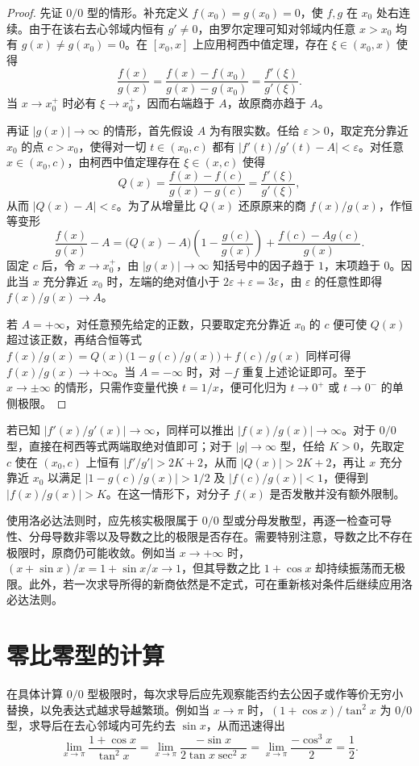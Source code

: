 \documentclass[UTF8,fontset=fandol,a4paper,12pt]{ctexart}
\theoremstyle{definition}
\begin{document}
\begin{proof}
先证 $0/0$ 型的情形。补充定义 $f(x_0)=g(x_0)=0$，使 $f,g$ 在 $x_0$ 处右连续。由于在该右去心邻域内恒有 $g'\ne0$，由罗尔定理可知对邻域内任意 $x>x_0$ 均有 $g(x)\ne g(x_0)=0$。在 $[x_0,x]$ 上应用柯西中值定理，存在 $\xi\in(x_0,x)$ 使得
\[
 \frac{f(x)}{g(x)}=\frac{f(x)-f(x_0)}{g(x)-g(x_0)}=\frac{f'(\xi)}{g'(\xi)}.
\]
当 $x\to x_0^+$ 时必有 $\xi\to x_0^+$，因而右端趋于 $A$，故原商亦趋于 $A$。

再证 $|g(x)|\to\infty$ 的情形，首先假设 $A$ 为有限实数。任给 $\varepsilon>0$，取定充分靠近 $x_0$ 的点 $c>x_0$，使得对一切 $t\in(x_0,c)$ 都有 $|f'(t)/g'(t)-A|<\varepsilon$。对任意 $x\in(x_0,c)$，由柯西中值定理存在 $\xi\in(x,c)$ 使得
\[
 Q(x)=\frac{f(x)-f(c)}{g(x)-g(c)}=\frac{f'(\xi)}{g'(\xi)},
\]
从而 $|Q(x)-A|<\varepsilon$。为了从增量比 $Q(x)$ 还原原来的商 $f(x)/g(x)$，作恒等变形
\[
 \frac{f(x)}{g(x)}-A
  =\bigl(Q(x)-A\bigr)\left(1-\frac{g(c)}{g(x)}\right)
   +\frac{f(c)-Ag(c)}{g(x)}.
\]
固定 $c$ 后，令 $x\to x_0^+$，由 $|g(x)|\to\infty$ 知括号中的因子趋于 $1$，末项趋于 $0$。因此当 $x$ 充分靠近 $x_0$ 时，左端的绝对值小于 $2\varepsilon+\varepsilon=3\varepsilon$，由 $\varepsilon$ 的任意性即得 $f(x)/g(x)\to A$。

若 $A=+\infty$，对任意预先给定的正数，只要取定充分靠近 $x_0$ 的 $c$ 便可使 $Q(x)$ 超过该正数，再结合恒等式 $f(x)/g(x)=Q(x)\bigl(1-g(c)/g(x)\bigr)+f(c)/g(x)$ 同样可得 $f(x)/g(x)\to+\infty$。当 $A=-\infty$ 时，对 $-f$ 重复上述论证即可。至于 $x\to\pm\infty$ 的情形，只需作变量代换 $t=1/x$，便可化归为 $t\to0^+$ 或 $t\to0^-$ 的单侧极限。
\end{proof}

若已知 $|f'(x)/g'(x)|\to\infty$，同样可以推出 $|f(x)/g(x)|\to\infty$。对于 $0/0$ 型，直接在柯西等式两端取绝对值即可；对于 $|g|\to\infty$ 型，任给 $K>0$，先取定 $c$ 使在 $(x_0,c)$ 上恒有 $|f'/g'|>2K+2$，从而 $|Q(x)|>2K+2$，再让 $x$ 充分靠近 $x_0$ 以满足 $|1-g(c)/g(x)|>1/2$ 及 $|f(c)/g(x)|<1$，便得到 $|f(x)/g(x)|>K$。在这一情形下，对分子 $f(x)$ 是否发散并没有额外限制。

使用洛必达法则时，应先核实极限属于 $0/0$ 型或分母发散型，再逐一检查可导性、分母导数非零以及导数之比的极限是否存在。需要特别注意，导数之比不存在极限时，原商仍可能收敛。例如当 $x\to+\infty$ 时，$(x+\sin x)/x=1+\sin x/x\to1$，但其导数之比 $1+\cos x$ 却持续振荡而无极限。此外，若一次求导所得的新商依然是不定式，可在重新核对条件后继续应用洛必达法则。

\section{零比零型的计算}
在具体计算 $0/0$ 型极限时，每次求导后应先观察能否约去公因子或作等价无穷小替换，以免表达式越求导越繁琐。例如当 $x\to\pi$ 时，$(1+\cos x)/\tan^2x$ 为 $0/0$ 型，求导后在去心邻域内可先约去 $\sin x$，从而迅速得出
\[
 \lim_{x\to\pi}\frac{1+\cos x}{\tan^2x}
 =\lim_{x\to\pi}\frac{-\sin x}{2\tan x\sec^2x}
 =\lim_{x\to\pi}\frac{-\cos^3x}{2}=\frac12.
\]
\end{document}
